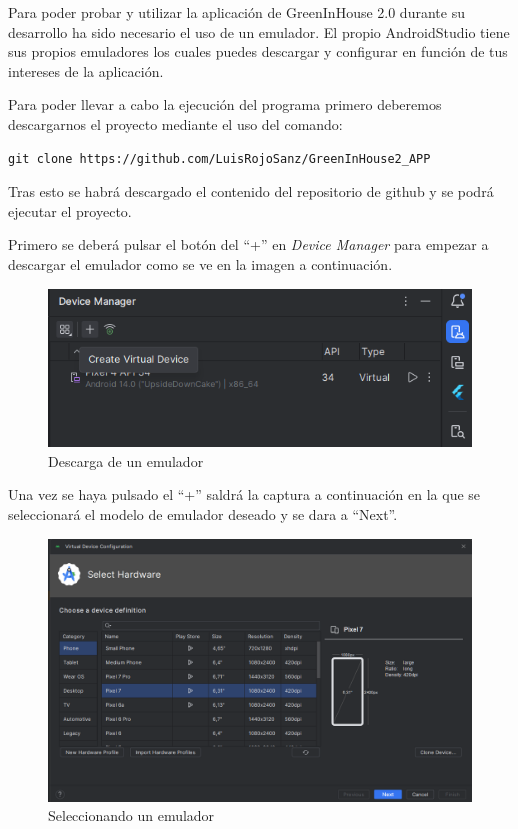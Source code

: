 Para poder probar y utilizar la aplicación de GreenInHouse 2.0 durante su desarrollo ha sido necesario el uso de un emulador. El propio AndroidStudio tiene sus propios emuladores los cuales puedes descargar y configurar en función de tus intereses de la aplicación.

Para poder llevar a cabo la ejecución del programa primero deberemos descargarnos el proyecto mediante el uso del comando:
\begin{verbatim}
git clone https://github.com/LuisRojoSanz/GreenInHouse2_APP
\end{verbatim}

Tras esto se habrá descargado el contenido del repositorio de github y se podrá ejecutar el proyecto.

Primero se deberá pulsar el botón del ``+'' en \textit{Device Manager} para empezar a descargar el emulador como se ve en la imagen a continuación.

\begin{figure}[H]
    \centering
    \includegraphics[width=0.8\linewidth]{InstalacionyEjecucion1.png}
    \caption{Descarga de un emulador}
    \label{C12}
\end{figure}

Una vez se haya pulsado el ``+'' saldrá la captura a continuación en la que se seleccionará el modelo de emulador deseado y se dara a ``Next''.

\begin{figure}[H]
    \centering
    \includegraphics[width=0.8\linewidth]{InstalacionyEjecucion2.png}
    \caption{Seleccionando un emulador}
    \label{C13}
\end{figure}

